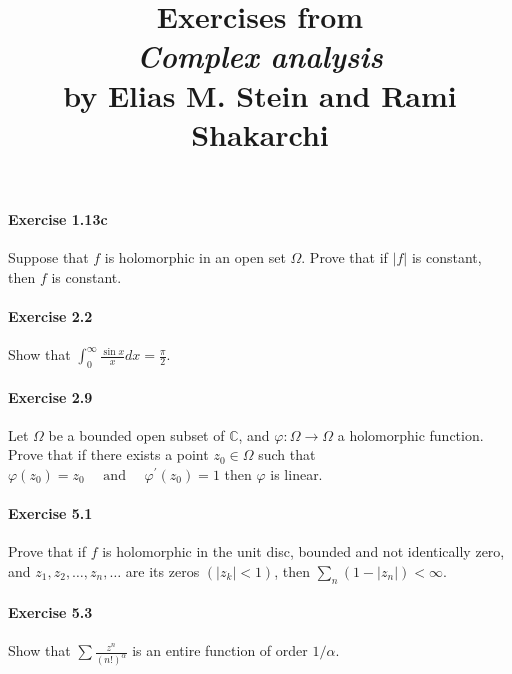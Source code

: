 \documentclass{article}
\title{\textbf{
Exercises from \\
\textit{Complex analysis} \\
by Elias M. Stein and Rami Shakarchi
}}
\date{}
\begin{document}
\maketitle

\paragraph{Exercise 1.13c} Suppose that $f$ is holomorphic in an open set $\Omega$. Prove that if $|f|$ is constant, then $f$ is constant.

\paragraph{Exercise 2.2} Show that $\int_{0}^{\infty} \frac{\sin x}{x} d x=\frac{\pi}{2}$.

\paragraph{Exercise 2.9} Let $\Omega$ be a bounded open subset of $\mathbb{C}$, and $\varphi: \Omega \rightarrow \Omega$ a holomorphic function. Prove that if there exists a point $z_{0} \in \Omega$ such that $\varphi\left(z_{0}\right)=z_{0} \quad \text { and } \quad \varphi^{\prime}\left(z_{0}\right)=1$ then $\varphi$ is linear.

\paragraph{Exercise 5.1} Prove that if $f$ is holomorphic in the unit disc, bounded and not identically zero, and $z_{1}, z_{2}, \ldots, z_{n}, \ldots$ are its zeros $\left(\left|z_{k}\right|<1\right)$, then $\sum_{n}\left(1-\left|z_{n}\right|\right)<\infty$.

\paragraph{Exercise 5.3} Show that $\sum \frac{z^{n}}{(n !)^{\alpha}}$ is an entire function of order $1 / \alpha$.
\end{document}
